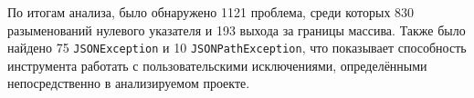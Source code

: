 По итогам анализа, было обнаружено 1121 проблема, среди которых 830 разыменований нулевого указателя и 193 выхода за границы массива. Также было найдено 75 \verb|JSONException| и 10 \verb|JSONPathException|, что показывает способность инструмента работать с пользовательскими исключениями, определёнными непосредственно в анализируемом проекте.






